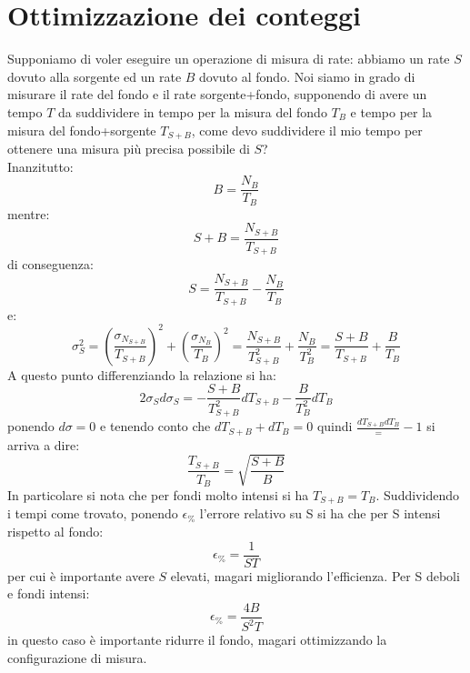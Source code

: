 \section{Ottimizzazione dei conteggi}
Supponiamo di voler eseguire un operazione di misura di rate: abbiamo un rate $S$ dovuto alla sorgente ed un rate $B$ dovuto al fondo.
Noi siamo in grado di misurare il rate del fondo e il rate sorgente+fondo, supponendo di avere un tempo $T$ da suddividere in tempo per la
misura del fondo $T_B$ e tempo per la misura del fondo+sorgente $T_{S+B}$, come devo suddividere il mio tempo per ottenere una misura
pi\`u precisa possibile di $S$?\\
Inanzitutto:
\begin{equation*}
B = \frac{N_B}{T_B}
\end{equation*}
mentre:
\begin{equation*}
S+B = \frac{N_{S+B}}{T_{S+B}}
\end{equation*}
di conseguenza:
\begin{equation*}
S = \frac{N_{S+B}}{T_{S+B}} - \frac{N_B}{T_B}
\end{equation*}
e:
\begin{equation*}
\sigma^2_S = \left(\frac{\sigma_{N_{S+B}}}{T_{S+B}}\right)^2 + \left(\frac{\sigma_{N_B}}{T_B}\right)^2= \frac{N_{S+B}}{T^2_{S+B}} + \frac{N_B}{T_B^2}
= \frac{S+B}{T_{S+B}} + \frac{B}{T_B}
\end{equation*}
A questo punto differenziando la relazione si ha:
\begin{equation*}
2 \sigma_S d\sigma_S = - \frac{S+B}{T^2_{S+B}} dT_{S+B} - \frac{B}{T_B^2} dT_B
\end{equation*}
ponendo $d\sigma = 0$ e tenendo conto che $dT_{S+B} + dT_B=0$ quindi $\frac{dT_{S+B}{dT_{B}}} = -1$ si arriva a dire:
\begin{equation*}
\frac{T_{S+B}}{T_B}  = \sqrt{\frac{S+B}{B}}
\end{equation*}
In particolare si nota che per fondi molto intensi si ha $T_{S+B}=T_B$.
Suddividendo i tempi come trovato, ponendo $\epsilon_{\%}$ l'errore relativo su S si ha che per S intensi rispetto al fondo:
\begin{equation*}
\epsilon_{\%} = \frac{1}{ST}
\end{equation*}
per cui \`e importante avere $S$ elevati, magari migliorando l'efficienza.
Per S deboli e fondi intensi:
\begin{equation*}
\epsilon_{\%} = \frac{4B}{S^2 T}
\end{equation*}
in questo caso \`e importante ridurre il fondo, magari ottimizzando la configurazione di misura.
